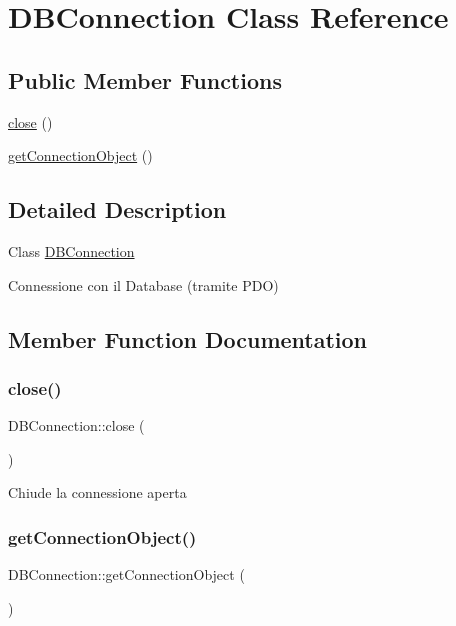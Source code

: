 \hypertarget{classDBConnection}{}\section{D\+B\+Connection Class Reference}
\label{classDBConnection}
\subsection*{Public Member Functions}
\begin{DoxyCompactItemize}
\item 
\hyperlink{classDBConnection_a4d8de6729ccad75263fbf64c0c9b17e1}{close} ()
\item 
\hyperlink{classDBConnection_ae3afdcd63c10127d62e170bb361e95c7}{get\+Connection\+Object} ()
\end{DoxyCompactItemize}


\subsection{Detailed Description}
Class \hyperlink{classDBConnection}{D\+B\+Connection}

Connessione con il Database (tramite P\+DO) 

\subsection{Member Function Documentation}
\mbox{\label{classDBConnection_a4d8de6729ccad75263fbf64c0c9b17e1}} 
\subsubsection{\texorpdfstring{close()}{close()}}
{\footnotesize\ttfamily D\+B\+Connection\+::close (\begin{DoxyParamCaption}{ }\end{DoxyParamCaption})}

Chiude la connessione aperta  \mbox{\label{classDBConnection_ae3afdcd63c10127d62e170bb361e95c7}} 
\subsubsection{\texorpdfstring{get\+Connection\+Object()}{getConnectionObject()}}
{\footnotesize\ttfamily D\+B\+Connection\+::get\+Connection\+Object (\begin{DoxyParamCaption}{ }\end{DoxyParamCaption})}

